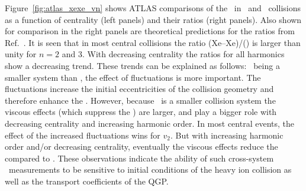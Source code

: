 Figure~\ref{fig:atlas_xexe_vn} shows ATLAS comparisons of the \vn\
  in \xexe\ and \pbpb\ collisions as a function of centrality (left panels)
  and their ratios (right panels).
Also shown for comparison in the right panels are theoretical predictions
  for the ratios from Ref.~\cite{Giacalone:2017dud}.
It is seen that in most central collisions the ratio \vn(Xe--Xe)/\vn(\pbpb) 
  is larger than unity for $n=2$ and 3.
With decreasing centrality the ratios for all harmonics show a decreasing trend.
These trends can be explained as follows:
  \xexe\ being a smaller system than \pbpb, the effect of fluctuations
  is more important.
The fluctuations increase the initial eccentricities of the collision
  geometry and therefore enhance the \vn.
However, because \xexe\ is a smaller collision system the viscous
  effects (which suppress the \vn) are larger, and play a bigger role
  with decreasing centrality and increasing harmonic order.
In most central events, the effect of the increased fluctuations wins
  for $v_2$.
But with increasing harmonic order and/or decreasing centrality, 
  eventually the viscous effects reduce the \vn compared to \pbpb.
These observations indicate the ability of such cross-system 
  \vn\ measurements to be sensitive to initial conditions of 
  the heavy ion collision as well as the transport coefficients
  of the QGP. 
